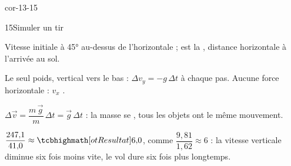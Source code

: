 \begin{blocLivre}{cor-13-15}
\begin{corrige}{15}{Simuler un tir}
\begin{questions}
\item Vitesse initiale  à \ang{45} au-dessus de l'horizontale ;  est la , distance horizontale à l'arrivée au sol.
\item Le seul poids, vertical vers le bas : $\Delta v_y=-g\,\Delta t$ à chaque pas. Aucune force horizontale : $v_x$ .
\item $\Delta\vec{v}=\dfrac{m\,\vec{g}}{m}\,\Delta t=\vec{g}\,\Delta t$ : la masse se , tous les objets ont le même mouvement.
\item $\dfrac{247{,}1}{41{,}0}\approx\res{6{,}0}$, comme $\dfrac{9{,}81}{1{,}62}\approx6$ : la vitesse verticale diminue six fois moins vite, le vol dure six fois plus longtemps.
\end{questions}
\end{corrige}
\end{blocLivre}
